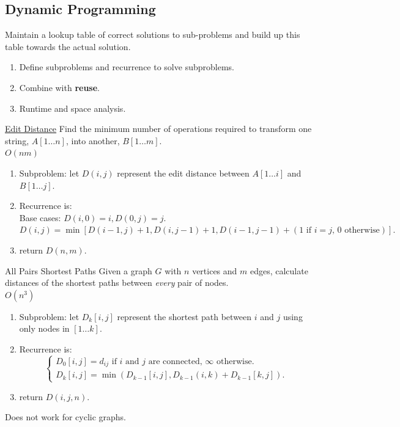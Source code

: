 \documentclass[10pt,a4paper]{article}
\begin{document}
\begin{multicols}{3}
\section{Dynamic Programming}

\begin{textbox}{}
 Maintain a lookup table of correct solutions to sub-problems and build up this table towards the actual solution.\\
\begin{enumerate}
    \item Define subproblems and recurrence to solve subproblems.
    \item Combine with {\bf reuse}.
    \item Runtime and space analysis.
\end{enumerate}
\end{textbox}

\begin{textbox}{\href{https://leetcode.com/problems/edit-distance/}{Edit Distance}}
    Find the minimum number of operations required to transform one string, $A[1\ldots n]$, into another, $B[1\ldots m]$. \\
  $O(nm)$
\begin{enumerate}
    \item Subproblem: let $D(i,j)$ represent the edit distance between $A[1\ldots i]$ and $B[1\ldots j]$.
    \item Recurrence is: \\
    Base cases: $D(i,0) = i, D(0,j) = j.$ \\
    $D(i,j) = \min[D(i-1,j)+1,D(i,j-1)+1,D(i-1,j-1)+ (1 \text { if } i = j \text {, $0$ otherwise})].$
    \item return $D(n,m)$.
\end{enumerate}
\end{textbox}

\begin{textbox}{All Pairs Shortest Paths}
    Given a graph $G$ with $n$ vertices and $m$ edges, calculate distances of the shortest paths between {\em every} pair of nodes. \\
  $O(n^3)$
\begin{enumerate}
    \item Subproblem: let $D_k[i,j]$ represent the shortest path between $i$ and $j$ using only nodes in $[1\ldots k]$.
    \item Recurrence is:
    \[\begin{cases}
            D_0[i,j] = d_{ij} \text{ if } i \text{ and } j \text{ are connected, } \infty \text{ otherwise}. \\ 
            D_k[i,j] = \min(D_{k - 1}[i,j], D_{k - 1}(i,k)+D_{k - 1}[k,j]). 
    \end{cases}\]
    \item return $D(i,j,n)$.
\end{enumerate}
 Does not work for cyclic graphs.
\end{textbox}


\end{multicols}
\end{document}

